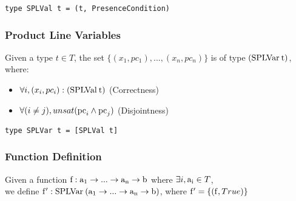 \documentclass[11pt]{article} %
\begin{document}
\begin{verbatim}
type SPLVal t = (t, PresenceCondition)
\end{verbatim}

\subsubsection{Product Line Variables}

Given a type $t \in T$, the set $\{(x_1, pc_1),...,(x_n, pc_n)\}$ is of type $(\type{SPLVar} \: \type{t})$, where:
\begin{itemize}
\item $\forall i, (x_i, pc_i) : (\type{SPLVal} \: \type{t})$ (Correctness)
\item $\forall (i \neq j), {unsat(\var{pc}_i \wedge \var{pc}_j)}$ (Disjointness)
\end{itemize}

\begin{prooftree}
\end{prooftree}

\begin{verbatim}
type SPLVar t = [SPLVal t]
\end{verbatim}




\subsubsection{Function Definition}
Given a function $\var{f} : \type{a_1} \to ... \to \type{a_n} \to \type{b}$ where $\exists i, \type{a_i} \in T$, \\
we define $\var{f'} : \type{SPLVar} \: (\type{a_1} \to ... \to \type{a_n} \to \type{b})$, where $\var{f'} = \{(\var{f}, True)\}$
\end{document}
